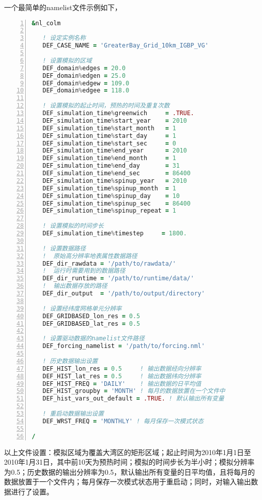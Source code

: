 一个最简单的namelist文件示例如下，
\begin{lstlisting}[language=fortran, basicstyle=\linespread{1.2}\footnotesize\ttfamily, commentstyle=\color{olive}, numbers=left, numberstyle=\tiny, xleftmargin=1.5em,xrightmargin=0em, aboveskip=1em]
&nl_colm

   ! 设定实例名称
   DEF_CASE_NAME = 'GreaterBay_Grid_10km_IGBP_VG'

   ! 设置模拟的区域
   DEF_domain%edges = 20.0
   DEF_domain%edgen = 25.0
   DEF_domain%edgew = 109.0
   DEF_domain%edgee = 118.0

   ! 设置模拟的起止时间，预热的时间及重复次数
   DEF_simulation_time%greenwich     = .TRUE.
   DEF_simulation_time%start_year    = 2010
   DEF_simulation_time%start_month   = 1
   DEF_simulation_time%start_day     = 1
   DEF_simulation_time%start_sec     = 0
   DEF_simulation_time%end_year      = 2010
   DEF_simulation_time%end_month     = 1
   DEF_simulation_time%end_day       = 31
   DEF_simulation_time%end_sec       = 86400
   DEF_simulation_time%spinup_year   = 2010
   DEF_simulation_time%spinup_month  = 1
   DEF_simulation_time%spinup_day    = 10
   DEF_simulation_time%spinup_sec    = 86400
   DEF_simulation_time%spinup_repeat = 1

   ! 设置模拟的时间步长
   DEF_simulation_time%timestep     = 1800.

   ! 设置数据路径
   !  原始高分辨率地表属性数据路径
   DEF_dir_rawdata = '/path/to/rawdata/'   
   !  运行时需要用到的数据路径
   DEF_dir_runtime = '/path/to/runtime/data/'   
   !  输出数据存放的路径
   DEF_dir_output  = '/path/to/output/directory'  

   ! 设置经纬度网格单元分辨率
   DEF_GRIDBASED_lon_res = 0.5
   DEF_GRIDBASED_lat_res = 0.5

   ! 设置驱动数据的namelist文件路径
   DEF_forcing_namelist = '/path/to/forcing.nml'

   ! 历史数据输出设置
   DEF_HIST_lon_res = 0.5     ! 输出数据经向分辨率
   DEF_HIST_lat_res = 0.5     ! 输出数据纬向分辨率
   DEF_HIST_FREQ = 'DAILY'    ! 输出数据的日平均值
   DEF_HIST_groupby = 'MONTH' ! 每月的数据放置在一个文件中
   DEF_hist_vars_out_default = .TRUE. ! 默认输出所有变量

   ! 重启动数据输出设置
   DEF_WRST_FREQ = 'MONTHLY' ! 每月保存一次模式状态

/
\end{lstlisting}

以上文件设置：模拟区域为覆盖大湾区的矩形区域；起止时间为2010年1月1日至2010年1月31日，其中前10天为预热时间；模拟的时间步长为半小时；模拟分辨率为0.5\textdegree；历史数据的输出分辨率为0.5\textdegree，默认输出所有变量的日平均值，且将每月的数据放置于一个文件内；每月保存一次模式状态用于重启动；同时，对输入输出数据进行了设置。

